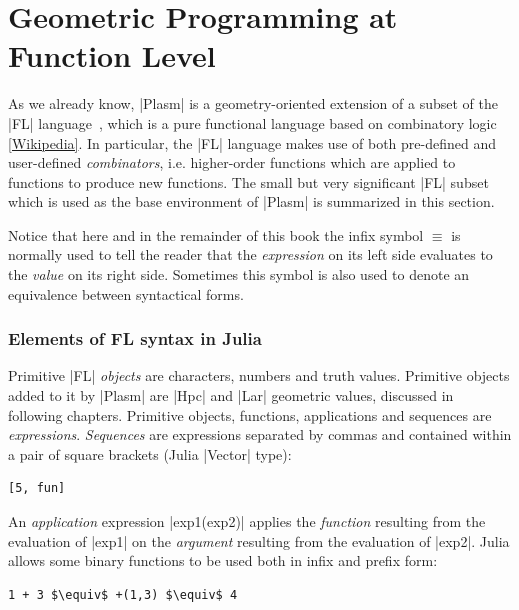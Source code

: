 \section{Geometric Programming at Function Level}\label{sect:2-3}

As we already know, |Plasm| is a geometry-oriented extension of a subset of
the |FL| language~\cite{BWW90,IBM:RJ7100}, which is a pure
functional language based on combinatory logic \href{https://en.wikipedia.org/wiki/Combinatory_logic}{[Wikipedia]}.  In particular, the
|FL| language makes use of both pre-defined and user-defined
\emph{combinators}, i.e. higher-order functions which are applied
to functions to produce new functions.  The small but very significant
|FL| subset which is used as the base environment of |Plasm| is summarized
in this section.  

Notice that here and in the remainder of this book the infix symbol
$\equiv$ is normally used to tell the reader that the
\emph{expression} on its left side evaluates to the \emph{value} on
its right side.  Sometimes this symbol is also used to denote an
equivalence between syntactical forms.




\subsubsection*{Elements of {FL} syntax in Julia}
\label{sec:FLsyntax}


Primitive |FL| \emph{objects} are characters, numbers and truth values.  Primitive objects added to it by |Plasm| are |Hpc| and |Lar| geometric values, discussed in following chapters.
Primitive objects, functions, applications and sequences are 
\emph{expressions}.
\emph{Sequences} are expressions separated by commas and contained within a pair
of square brackets (Julia |Vector| type):
\begin{lstlisting}[language=JuliaLocal, style=julia, mathescape = true]
[5, fun]
\end{lstlisting}

 An \emph{application} expression |exp1(exp2)| applies the 
\emph{function} resulting from the evaluation of |exp1| on the 
\emph{argument} resulting from the evaluation of |exp2|.  Julia 
allows some binary functions to be used both in infix and prefix form:
\begin{lstlisting}[language=JuliaLocal, style=julia, mathescape = true]
1 + 3 $\equiv$ +(1,3) $\equiv$ 4
\end{lstlisting}

